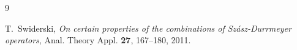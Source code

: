 \documentclass[12pt,reqno]{article}
\begin{document}
\begin{thebibliography}{9}


 T.~Swiderski, \textit{On certain properties of the combinations
of Sz\'{a}sz-Durrmeyer operators}, Anal. Theory Appl. \textbf{27}, 167--180, 2011.

\end{thebibliography}

\thispagestyle{empty}

~\vfill
\end{document}
